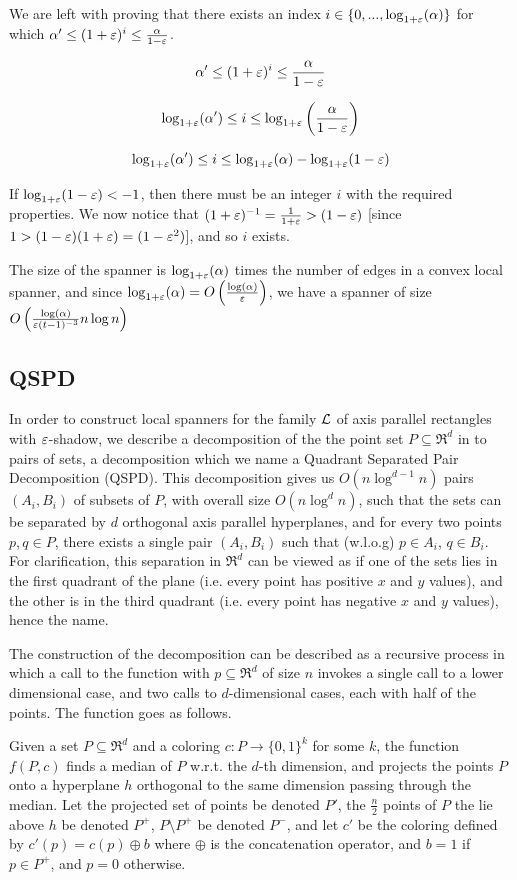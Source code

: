 \documentclass[12pt]{article}%
\begin{document}
We are left with proving that there exists an index $i\in \{0,...,\log_{1+\varepsilon}(\alpha)\}$ for which $\alpha' \leq (1+\varepsilon)^i \leq \frac{\alpha}{1-\varepsilon}$.

$$\alpha' \leq (1+\varepsilon)^i \leq \frac{\alpha}{1-\varepsilon}$$

$$\log_{1+\varepsilon}(\alpha') \leq i \leq \log_{1+\varepsilon}\left(\frac{\alpha}{1-\varepsilon}\right)$$

$$\log_{1+\varepsilon}(\alpha') \leq i \leq \log_{1+\varepsilon}(\alpha) - \log_{1+\varepsilon}(1-\varepsilon)$$

If $\log_{1+\varepsilon}(1-\varepsilon)<-1$, then there must be an integer $i$ with the required properties. We now notice that $(1+\varepsilon)^{-1}=\frac{1}{1+\varepsilon}>(1-\varepsilon)$ [since $1>(1-\varepsilon)(1+\varepsilon)=(1-\varepsilon^2)$], and so $i$ exists.

The size of the spanner is $\log_{1+\varepsilon}(\alpha)$ times the number of edges in a convex local spanner, and since $\log_{1+\varepsilon}(\alpha)=O\left(\frac{\log(\alpha)}{\varepsilon}\right)$, we have a spanner of size $O\left(\frac{\log(\alpha)}{\varepsilon (t-1)^{-3}}n\log n\right)$

\subsection{QSPD}

In order to construct local spanners for the family $\mathcal{L}$ of axis parallel rectangles with $\varepsilon$-shadow, we describe a decomposition of the the point set $P\subseteq \Re^d$ in to pairs of sets, a decomposition which we name a Quadrant Separated Pair Decomposition (QSPD). This decomposition gives us $O(n\log^{d-1}n)$ pairs $(A_i,B_i)$ of subsets of $P$, with overall size $O(n\log^{d}n)$, such that the sets can be separated by $d$ orthogonal axis parallel hyperplanes, and for every two points $p,q\in P$, there exists a single pair $(A_i,B_i)$ such that (w.l.o.g) $p\in A_i$, $q\in B_i$. For clarification, this separation in $\Re^d$ can be viewed as if one of the sets lies in the first quadrant of the plane (i.e. every point has positive $x$ and $y$ values), and the other is in the third quadrant (i.e. every point has negative $x$ and $y$ values), hence the name.

The construction of the decomposition can be described as a recursive process in which a call to the function with $p\subseteq \Re^d$ of size $n$ invokes a single call to a lower dimensional case, and two calls to $d$-dimensional cases, each with half of the points. The function goes as follows.

Given a set $P\subseteq \Re^d$ and a coloring $c:P\longrightarrow \{0,1\}^k$ for some $k$, the function $f(P,c)$ finds a median of $P$ w.r.t. the $d$-th dimension, and projects the points $P$ onto a hyperplane $h$ orthogonal to the same dimension passing through the median. Let the projected set of points be denoted $P'$, the $\frac{n}{2}$ points of $P$ the lie above $h$ be denoted $P^+$, $P\setminus P^+$ be denoted $P^-$, and let $c'$ be the coloring defined by  $c'(p)=c(p)\oplus b$ where $\oplus$ is the concatenation operator, and $b=1$ if $p\in P^+$, and $p=0$ otherwise.
\end{document}
